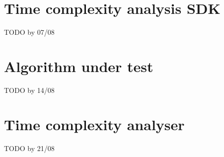 \section{Time complexity analysis SDK}

TODO by 07/08


\section{Algorithm under test}

TODO by 14/08


\section{Time complexity analyser}
\label{sec:implementation:timecomplexityanalyser} 
TODO by 21/08
